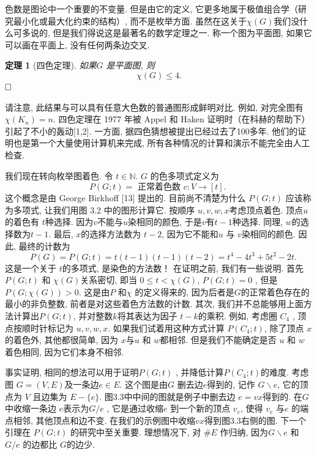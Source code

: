 \documentclass[a4paper,12pt]{ctexbook}
\newtheorem{theorem}[lemma]{\hspace{2em}定理}%
\begin{document}
色数是图论中一个重要的不变量. 但是由它的定义, 它更多地属于极值组合学（研究最小化或最大化约束的结构）, 而不是枚举方面. 虽然在这关于$\chi(G)$我们没什么可多说的, 但是我们得说这是最著名的数学定理之一. 称一个图为{\kaishu 平面图}, 如果它可以画在平面上, 没有任何两条边交叉.

\begin{theorem}[四色定理]
	如果$G$ 是平面图, 则$$
	\chi(G) \leq 4.$$
	 $\hfill\square$
\end{theorem}

请注意, 此结果与可以具有任意大色数的普通图形成鲜明对比. 例如, 对完全图有 $\chi\left(K_{n}\right)=n$. 四色定理在 1977 年被 Appel 和 Haken 证明时（在科赫的帮助下）引起了不小的轰动[1,2]. 一方面, 据四色猜想被提出已经过去了100多年. 他们的证明也是第一个大量使用计算机来完成, 所有各种情况的计算和演示不能完全由人工检查.

我们现在转向枚举图着色. 令 $t \in \mathbb{N}$.  $G$ 的色多项式定义为
$$
P(G ; t)=\text { 正常着色数 } c: V \rightarrow[t] \text {. }
$$
这个概念是由 George Birkhoff [13] 提出的. 目前尚不清楚为什么
 $P(G ; t)$ 应该称为多项式, 让我们用图 3.2 中的图形计算它. 按顺序 $u, v, w, x$考虑顶点着色. 顶点$u$的着色有 $t$种选择. 因为$v$不能与$u$染相同的颜色, 于是$v$有$t-1$种选择. 同理,  $w$的选择数为$t-1$. 最后,  $x$的选择方法数为 $t-2$, 因为它不能和$u$ 与 $v$染相同的颜色. 因此, 最终的计数为
\[\quad P(G)=P(G ; t)=t(t-1)(t-1)(t-2)=t^{4}-4 t^{3}+5 t^{2}-2 t.\tag{3.23} \]
这是一个关于 $t$的多项式, 是染色的方法数！ 在证明之前, 我们有一些说明. 首先 $P(G ; t)$ 和 $\chi(G)$关系密切, 即当 $0 \leq t<\chi(G)$,  $P(G ; t)=0$ , 但是 $P(G ; \chi(G))>0$. 这是由$P$ 和$\chi$ 的定义得来的, 因为后者是$G$的正常着色存在的最小的非负整数, 前者是对这些着色方法数的计数. 其次, 我们并不总能够用上面方法计算出$P(G ; t)$, 并对整数$k$将其表达为因子 $t-k$的乘积. 例如, 考虑圈 $C_{4}$ , 顶点按顺时针标记为 $u, v, w, x$. 如果我们试着用这种方式计算 $P\left(C_{4} ; t\right)$, 除了顶点  $x$的着色外, 其他都很简单, 因为 $x$与$u$ 和 $w$都相邻. 但是我们不能确定是否 $u$ 和 $w$ 着色相同, 因为它们本身不相邻.

事实证明, 相同的想法可以用于证明$P(G ; t)$ , 并降低计算$P\left(C_{4} ; t\right)$的难度. 考虑图  $G=(V, E)$及一条边$e \in E$. 这个图是由$G$ 删去边$e$得到的, 记作 $G \backslash e$, 它的顶点为 $V$ 且边集为 $E-\{e\}$. 图3.3中中间的图就是例子中删去边  $e=v x$得到的. 在$G$ 中收缩一条边 $e$表示为$G / e$ , 它是通过收缩$e$ 到一个新的顶点 $v_{e}$, 使得 $v_{e}$ 与$e$ 的端点相邻, 其他顶点和边不变. 在我们的示例图中收缩$v x$得到图3.3右侧的图. 下一个引理在 $P(G ; t)$  的研究中至关重要. 理想情况下, 对 $\# E$ 作归纳, 因为$G \backslash e$ 和 $G / e$ 的边都比  $G$的边少.
\end{document}
